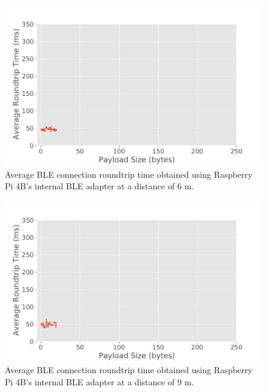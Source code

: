 \begin{figure}[H]
    \centering
    \includegraphics[width=0.9\linewidth]{images/ble-roundtrip-hci1-600cm.pdf}
    \caption[Average \acs{BLE} connection roundtrip time obtained using the Raspberry Pi 4B's internal \acs{BLE} adapter at a distance of 6 m.]{Average \acs{BLE} connection roundtrip time obtained using Raspberry Pi 4B's internal \acs{BLE} adapter at a distance of $6\text{ m}$.}
    \label{fig:ble-roundtrip-hci1-6m}
\end{figure}

\begin{figure}[H]
    \centering
    \includegraphics[width=0.9\linewidth]{images/ble-roundtrip-hci1-900cm.pdf}
    \caption[Average \acs{BLE} connection roundtrip time obtained using the Raspberry Pi 4B's internal \acs{BLE} adapter at a distance of 9 m.]{Average \acs{BLE} connection roundtrip time obtained using Raspberry Pi 4B's internal \acs{BLE} adapter at a distance of $9\text{ m}$.}
    \label{fig:ble-roundtrip-hci1-9m}
\end{figure}

